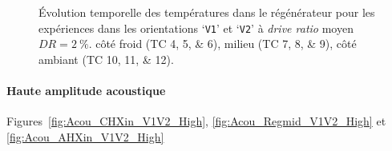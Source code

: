 %    

\begin{figure}[!ht]
    \centering
	\begin{subfigure}{\textwidth}
		\centering
    	
		\caption{}
		\label{fig:Acou_CHXin_V1V2_Mid}
	\end{subfigure}		
	\begin{subfigure}{\textwidth}
		\centering
    	
		\caption{}
		\label{fig:Acou_Regmid_V1V2_Mid}
	\end{subfigure}		
	\begin{subfigure}{\textwidth}
		\centering
    	
		\caption{}
		\label{fig:Acou_AHXin_V1V2_Mid}
	\end{subfigure}		
    \caption{\'Evolution temporelle des températures dans le régénérateur pour les expériences dans les orientations `\texttt{V1}' et `\texttt{V2}' à \textit{drive ratio} moyen $DR=\qty{2}{\percent}$.  côté froid (TC \numlist{4;5;6}),  milieu (TC \numlist{7;8;9}),  côté ambiant (TC \numlist{10;11;12}).}
    \label{fig:Acou_V1V2_Mid}
\end{figure}

\paragraph*{Haute amplitude acoustique} Figures~\ref{fig:Acou_CHXin_V1V2_High}, \ref{fig:Acou_Regmid_V1V2_High} et \ref{fig:Acou_AHXin_V1V2_High}

%    

